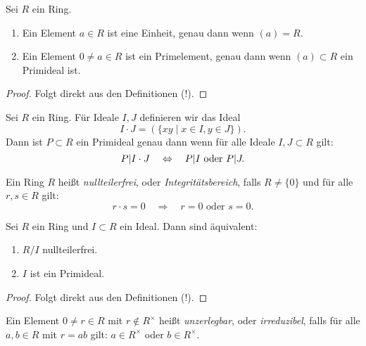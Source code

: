 \documentclass{book}
\begin{document}
\begin{prop}
    \label{prop:elementideal}
    Sei $R$ ein Ring.
    \begin{enumerate}
        \item Ein Element $a \in R$ ist eine Einheit, genau dann wenn $(a) = R$. 
        \item Ein Element $0 \neq a \in R$ ist ein Primelement, genau dann wenn $(a)
            \subset R$ ein Primideal ist. 
    \end{enumerate}
\end{prop}
\begin{proof}
    Folgt direkt aus den Definitionen (!).
\end{proof}

\begin{prob}
    \label{prob:prim}
    Sei $R$ ein Ring. Für Ideale $I,J$ definieren wir das Ideal
    \[
        I \cdot J = (\{ xy \; | \; x \in I, y \in J\}).
    \]
    Dann ist $P \subset R$ ein Primideal genau dann wenn für alle Ideale $I,J \subset R$ gilt:
    \[
        P | I \cdot J \quad \Leftrightarrow \quad P | I \text{ oder } P | J.
    \]
\end{prob}

\begin{defi}
    \label{defi:integraldomain}
    Ein Ring $R$ heißt \emph{nullteilerfrei}, oder \emph{Integritätsbereich}, falls $R \neq \{0\}$ und für alle
    $r,s \in R$ gilt:
    \[
        r \cdot s =0  \quad \Rightarrow \quad \text{$r = 0$ oder $s = 0$}.
    \]
\end{defi}

\begin{prop}
    \label{prop:nullteilerfreiprim}
    Sei $R$ ein Ring und $I \subset R$ ein Ideal. Dann sind äquivalent:
    \begin{enumerate}[label=(\roman*)]
        \item $R/I$ nullteilerfrei. 
        \item $I$ ist ein Primideal.
    \end{enumerate}
\end{prop}
\begin{proof}
    Folgt direkt aus den Definitionen (!).
\end{proof}

\begin{term}
    \label{term:unzerlegbar}
    Ein Element $0 \neq r \in R$ mit $r \notin R^{\times}$ heißt
    \emph{unzerlegbar}, oder \emph{irreduzibel}, falls für alle $a,b \in R$ mit
    $r = ab$ gilt: $a \in R^{\times}$ oder $b \in R^{\times}$.  
\end{term}
\end{document}
